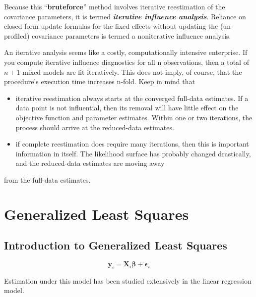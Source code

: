 \documentclass[12pt, a4paper]{report}
\begin{document}
		Because this “\textbf{bruteforce}”
		method involves iterative reestimation of the covariance parameters, it is termed \textbf{\textit{iterative influence
				analysis}}. Reliance on closed-form update formulas for the fixed effects without updating the (un-profiled)
		covariance parameters is termed a noniterative influence analysis.
		
		An iterative analysis seems like a costly, computationally intensive enterprise. If you compute iterative
		influence diagnostics for all n observations, then a total of $n + 1$ mixed models are fit iteratively. This does
		not imply, of course, that the procedure’s execution time increases n-fold. Keep in mind that
		\begin{itemize}
			\item iterative reestimation always starts at the converged full-data estimates. If a data point is not influential,
			then its removal will have little effect on the objective function and parameter estimates. Within
			one or two iterations, the process should arrive at the reduced-data estimates.
			\item if complete reestimation does require many iterations, then this is important information in itself. The
			likelihood surface has probably changed drastically, and the reduced-data estimates are moving away
		\end{itemize}
		from the full-data estimates.

\newpage
\section{Generalized Least Squares}

\subsection{Introduction to Generalized Least Squares}
\begin{equation}
\boldsymbol{y}_i = \boldsymbol{X}_i\boldsymbol{\beta} + \boldsymbol{\epsilon}_i
\end{equation}

Estimation under this model has been studied extensively in the linear regression model.

\newpage
\end{document}
